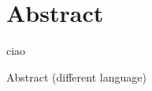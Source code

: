 %
\chapter*{Abstract}
\label{Ciao}
\vspace*{-10mm}

ciao

\vspace*{20mm}

{Abstract (different language)}\label{sec:abstract-diff} \\

\blindtext
